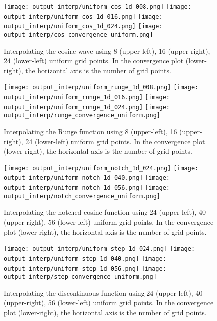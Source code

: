 \clearpage
\begin{figure}[tb] \centering
\texttt{[image: output\_interp/uniform\_cos\_1d\_008.png]}
\texttt{[image: output\_interp/uniform\_cos\_1d\_016.png]}
\texttt{[image: output\_interp/uniform\_cos\_1d\_024.png]}
\texttt{[image: output\_interp/cos\_convergence\_uniform.png]}
\caption{Interpolating the cosine wave using 8 (upper-left), 16 (upper-right),
         24 (lower-left) uniform grid points.
         In the convergence plot (lower-right), the horizontal axis is the
         number of grid points.}
\label{interp_cos_uniform}
\end{figure}

\begin{figure}[tb] \centering
\texttt{[image: output\_interp/uniform\_runge\_1d\_008.png]}
\texttt{[image: output\_interp/uniform\_runge\_1d\_016.png]}
\texttt{[image: output\_interp/uniform\_runge\_1d\_024.png]}
\texttt{[image: output\_interp/runge\_convergence\_uniform.png]}
\caption{Interpolating the Runge function using 8 (upper-left),
         16 (upper-right), 24 (lower-left) uniform grid points.
         In the convergence plot (lower-right), the horizontal axis is the
         number of grid points.}
\label{interp_runge_uniform}
\end{figure}

\clearpage
\begin{figure}[tb] \centering
\texttt{[image: output\_interp/uniform\_notch\_1d\_024.png]}
\texttt{[image: output\_interp/uniform\_notch\_1d\_040.png]}
\texttt{[image: output\_interp/uniform\_notch\_1d\_056.png]}
\texttt{[image: output\_interp/notch\_convergence\_uniform.png]}
\caption{Interpolating the notched cosine function using 24 (upper-left),
         40 (upper-right), 56 (lower-left) uniform grid points.
         In the convergence plot (lower-right), the horizontal axis is the
         number of grid points.}
\label{interp_notch_uniform}
\end{figure}

\begin{figure}[tb!] \centering
\texttt{[image: output\_interp/uniform\_step\_1d\_024.png]}
\texttt{[image: output\_interp/uniform\_step\_1d\_040.png]}
\texttt{[image: output\_interp/uniform\_step\_1d\_056.png]}
\texttt{[image: output\_interp/step\_convergence\_uniform.png]}
\caption{Interpolating the discontinuous function using 24 (upper-left),
         40 (upper-right), 56 (lower-left) uniform grid points.
         In the convergence plot (lower-right), the horizontal axis is the
         number of grid points.}
\label{interp_step_uniform}
\end{figure}


